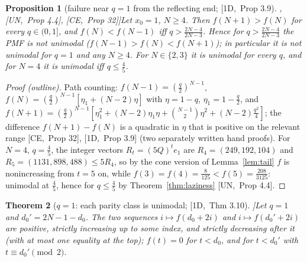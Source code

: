 \documentclass[10pt,a4paper]{article}
\theoremstyle{plain}
\newtheorem{theorem}{Theorem}[section]
\newtheorem{proposition}[theorem]{Proposition}
\theoremstyle{definition}
\newcommand{\src}[2]{[\textsf{#1},~#2]}           %
\newcommand{\ONE}{\textsf{1D}}
\newcommand{\UNI}{\textsf{UN}}
\newcommand{\CER}{\textsf{CE}}
\begin{document}
\begin{proposition}[failure near $q=1$ from the reflecting end; \src{\ONE}{Prop 3.9}, \src{\UNI}{Prop 4.4}, \src{\CER}{Prop 32}]\label{prop:1d-fail}
Let $x_0=1$, $N\ge4$. Then $f(N+1)>f(N)$ for every $q\in(0,1]$, and $f(N)<f(N-1)$ iff $q>\frac{2N-4}{2N-3}$. Hence for $q>\frac{2N-4}{2N-3}$ the PMF is not unimodal ($f(N-1)>f(N)<f(N+1)$); in particular it is not unimodal for $q=1$ and any $N\ge4$. For $N\in\{2,3\}$ it is unimodal for every $q$, and for $N=4$ it is unimodal iff $q\le\frac45$.
\end{proposition}
\begin{proof}[Proof (outline)]
Path counting: $f(N-1)=(\frac q2)^{N-1}$, $f(N)=(\frac q2)^{N-1}[\eta_1+(N-2)\eta]$ with $\eta=1-q$, $\eta_1=1-\frac q2$, and $f(N+1)=(\frac q2)^{N-1}[\eta_1^2+(N-2)\eta_1\eta+\binom{N-1}2\eta^2+(N-2)\frac{q^2}4]$; the difference $f(N+1)-f(N)$ is a quadratic in $\eta$ that is positive on the relevant range \src{\CER}{Prop 32}, \src{\ONE}{Prop 3.9} (two separately written hand proofs). For $N=4$, $q=\frac45$, the integer vectors $R_t=(5Q)^te_1$ are $R_4=(249,192,104)$ and $R_5=(1131,898,488)\le5R_4$, so by the cone version of Lemma~\ref{lem:tail} $f$ is nonincreasing from $t=5$ on, while $f(3)=f(4)=\frac8{125}<f(5)=\frac{208}{3125}$: unimodal at $\frac45$, hence for $q\le\frac45$ by Theorem~\ref{thm:laziness} \src{\UNI}{Prop 4.4}.
\end{proof}

\begin{theorem}[$q=1$: each parity class is unimodal; \src{\ONE}{Thm 3.10}]\label{thm:1d-parity}
Let $q=1$ and $d_0'=2N-1-d_0$. The two sequences $i\mapsto f(d_0+2i)$ and $i\mapsto f(d_0'+2i)$ are positive, strictly increasing up to some index, and strictly decreasing after it (with at most one equality at the top); $f(t)=0$ for $t<d_0$, and for $t<d_0'$ with $t\equiv d_0'\pmod2$.
\end{theorem}
\end{document}
